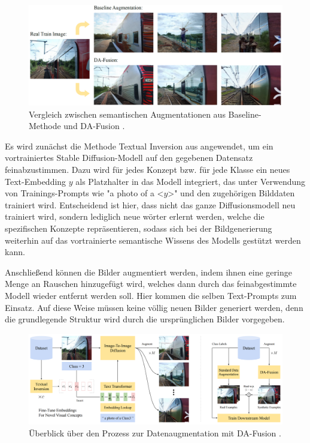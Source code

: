 \begin{figure}[h]
	\centering
	\includegraphics[width=16cm]{figure_da-fusion_vs_baseline.png}
	\caption{Vergleich zwischen semantischen Augmentationen aus Baseline-Methode und DA-Fusion \parencite{Trabucco2023dafusion}.}
	\label{fig:da-fusion}
\end{figure}

Es wird zunächst die Methode Textual Inversion aus \parencite{Gal2022textualinversion} angewendet, um ein vortrainiertes Stable Diffusion-Modell auf den gegebenen Datensatz feinabzustimmen. Dazu wird für jedes Konzept bzw. für jede Klasse ein neues Text-Embedding $y$ als Platzhalter in das Modell integriert, das unter Verwendung von Trainings-Prompts wie "a photo of a <$y$>" und den zugehörigen Bilddaten trainiert wird. Entscheidend ist hier, dass nicht das ganze Diffusionsmodell neu trainiert wird, sondern lediglich neue wörter erlernt werden, welche die spezifischen Konzepte repräsentieren, sodass sich bei der Bildgenerierung weiterhin auf das vortrainierte semantische Wissens des Modells gestützt werden kann.

Anschließend können die Bilder augmentiert werden, indem ihnen eine geringe Menge an Rauschen hinzugefügt wird, welches dann durch das feinabgestimmte Modell wieder entfernt werden soll. Hier kommen die selben Text-Prompts zum Einsatz. Auf diese Weise müssen keine völlig neuen Bilder generiert werden, denn die grundlegende Struktur wird durch die ursprünglichen Bilder vorgegeben.

\begin{figure}
	\centering
	\includegraphics[width=16cm]{figure_da-fusion_architecture.png}
	\caption{Überblick über den Prozess zur Datenaugmentation mit DA-Fusion \parencite{Trabucco2023dafusion}.}
	\label{fig:da-fusion-process}
\end{figure}

